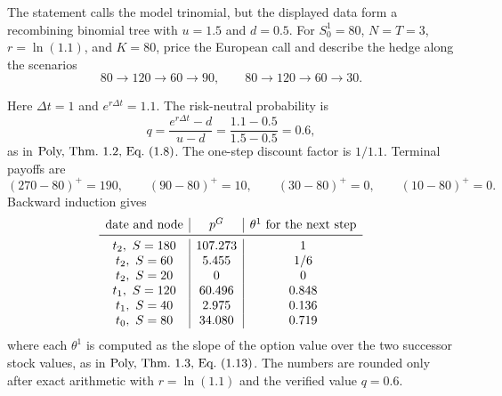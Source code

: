 \begin{exercise}
The statement calls the model trinomial, but the displayed data form a
recombining binomial tree with \(u=1.5\) and \(d=0.5\).  For
\(S^1_0=80\), \(N=T=3\), \(r=\ln(1.1)\), and \(K=80\), price the European
call and describe the hedge along the scenarios
\[
  80\to120\to60\to90,
  \qquad
  80\to120\to60\to30.
\]
\end{exercise}

\begin{solution}
Here \(\Delta t=1\) and \(e^{r\Delta t}=1.1\).  The risk-neutral probability
is
\[
  q=\frac{e^{r\Delta t}-d}{u-d}
   =\frac{1.1-0.5}{1.5-0.5}
   =0.6,
\]
as in \(\textup{Poly, Thm.~1.2, Eq.~(1.8)}\).  The one-step discount factor is
\(1/1.1\).  Terminal payoffs are
\[
  (270-80)^+=190,\qquad
  (90-80)^+=10,\qquad
  (30-80)^+=0,\qquad
  (10-80)^+=0.
\]
Backward induction gives
\[
\begin{array}{c|c|c}
\text{date and node} & p^G & \theta^1\text{ for the next step}\\
\midrule
t_2,\ S=180 & 107.273 & 1\\
t_2,\ S=60  & 5.455   & 1/6\\
t_2,\ S=20  & 0       & 0\\
t_1,\ S=120 & 60.496  & 0.848\\
t_1,\ S=40  & 2.975   & 0.136\\
t_0,\ S=80  & 34.080  & 0.719
\end{array}
\]
where each \(\theta^1\) is computed as the slope of the option value over the
two successor stock values, as in \(\textup{Poly, Thm.~1.3, Eq.~(1.13)}\).
The numbers are rounded only after exact arithmetic with \(r=\ln(1.1)\) and
the verified value \(q=0.6\).


\end{solution}
